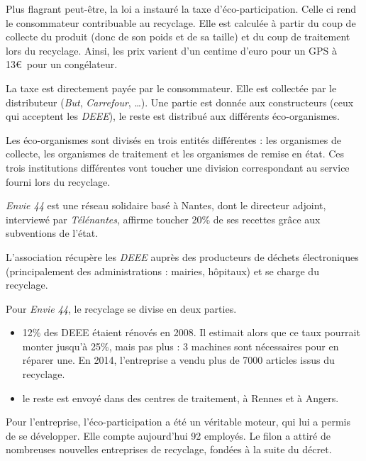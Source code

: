 Plus flagrant peut-être, la loi a instauré la taxe d'éco-participation. Celle ci rend le consommateur contribuable au recyclage. Elle est calculée à partir du coup de collecte du produit (donc de son poids et de sa taille) et du coup de traitement lors du recyclage. Ainsi, les prix varient d'un centime d'euro pour un GPS à 13\euro~pour un congélateur. 

La taxe est directement payée par le consommateur. Elle est collectée par le distributeur (\textit{But}, \textit{Carrefour}, \dots). Une partie est donnée aux constructeurs (ceux qui acceptent les \textit{DEEE}), le reste est distribué aux différents éco-organismes. 

Les éco-organismes sont divisés en trois entités différentes : les organismes de collecte, les organismes de traitement et les organismes de remise en état. Ces trois institutions différentes vont toucher une division correspondant au service fourni lors du recyclage. 

\medbreak


\textit{Envie 44}  est une réseau solidaire basé à Nantes, dont le directeur adjoint, interviewé par \textit{Télénantes}, affirme toucher 20\% de ses recettes grâce aux subventions de l'état\cite{7andco}.

L'association récupère les \textit{DEEE} auprès des producteurs de déchets électroniques (principalement des administrations : mairies, hôpitaux) et se charge du recyclage. 

Pour \textit{Envie 44}, le recyclage se divise en deux parties. 
\begin{itemize}
\item 12\% des DEEE étaient rénovés en 2008. Il estimait alors que ce taux pourrait monter jusqu'à 25\%, mais pas plus : 3 machines sont nécessaires pour en réparer une. En 2014, l'entreprise a vendu plus de 7000 articles issus du recyclage. 
\item le reste est envoyé dans des centres de traitement, à Rennes et à Angers.
\end{itemize}

Pour l'entreprise, l'éco-participation a été un véritable moteur, qui lui a permis de se développer. Elle compte aujourd'hui 92 employés. Le filon a attiré de nombreuses nouvelles entreprises de recyclage, fondées à la suite du décret. 

\bigbreak

